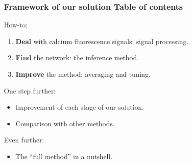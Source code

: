 \documentclass[final]{beamer}
\begin{document}

\begin{frame}

\frametitle{Framework of our solution  \hspace{15pt} {\small Table of contents} }

{\color{red} How-to}:
\begin{enumerate}
\item \textbf{Deal} with calcium fluorescence signals: {\color{i6blue} signal processing}.
\item \textbf{Find} the network: the {\color{i6blue} {inference} method}.
\item \textbf{Improve} the method: {\color{i6blue} {averaging}} and {\color{i6blue} {tuning}}.
\end{enumerate}\vskip5pt

{\color{red} One step further}:
\begin{itemize}
\item Improvement of each stage of our solution.
\item Comparison with other methods.
\end{itemize}\vskip5pt

{\color{red} Even further}: 
\begin{itemize}
\item The ``full method'' in a nutshell.
\end{itemize}

\end{frame}

\end{document}
